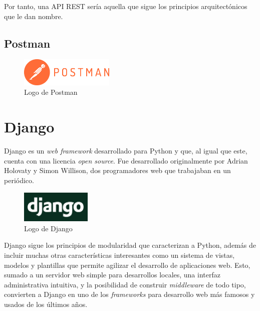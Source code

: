Por tanto, una API REST sería aquella que sigue los principios arquitectónicos que le dan nombre.

\subsection{Postman}\label{sec:postman}

\begin{figure}[ht]
    \centering
    \includegraphics[width=0.4\textwidth]{Figures/postman-logo}
    \decoRule
    \caption[Postman (Logo)]{Logo de Postman \emph{\parencite{Reference29}}}
    \label{fig:postman-logo}
\end{figure}


\section{Django}\label{sec:django}

Django es un \emph{web framework} desarrollado para Python y que, al igual que este, cuenta con una licencia \emph{open source}. Fue desarrollado originalmente por Adrian Holovaty y Simon Willison, dos programadores web que trabajaban en un periódico. \emph{\parencite{Reference4}}

\begin{figure}[ht]
    \centering
    \includegraphics[width=0.3\textwidth]{Figures/django-logo}
    \decoRule
    \caption[Django (Logo)]{Logo de Django \emph{\parencite{Reference5}}}
    \label{fig:django-logo}
\end{figure}

Django sigue los principios de modularidad que caracterizan a Python, además de incluir muchas otras características interesantes como un sistema de vistas, modelos y plantillas que permite agilizar el desarrollo de aplicaciones web. Esto, sumado a un servidor web simple para desarrollos locales, una interfaz administrativa intuitiva, y la posibilidad de construir \emph{middleware} de todo tipo, convierten a Django en uno de los \emph{frameworks} para desarrollo web más famosos y usados de los últimos años. \emph{\parencite{Reference4}}

